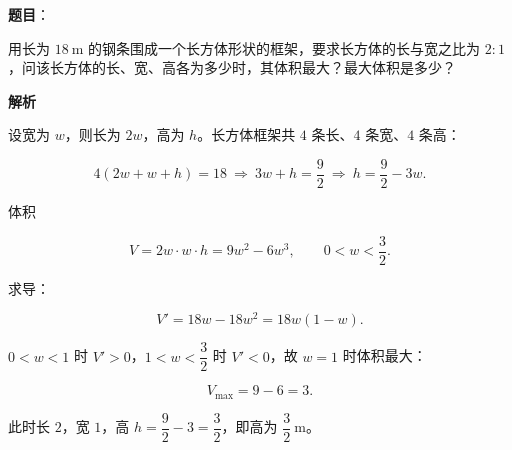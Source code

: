 \begin{answer}

\textbf{题目}：

用长为 $18\ \mathrm m$ 的钢条围成一个长方体形状的框架，要求长方体的长与宽之比为 $2:1$，问该长方体的长、宽、高各为多少时，其体积最大？最大体积是多少？

\textbf{解析}

设宽为 $w$，则长为 $2w$，高为 $h$。长方体框架共 $4$ 条长、$4$ 条宽、$4$ 条高：

\nopagebreak[4]
\[4(2w+w+h)=18\ \Rightarrow\ 3w+h=\frac92\ \Rightarrow\ h=\frac92-3w.\]

体积

\nopagebreak[4]
\[V=2w\cdot w\cdot h=9w^2-6w^3,\qquad 0<w<\frac32.\]

求导：

\nopagebreak[4]
\[V'=18w-18w^2=18w(1-w).\]

$0<w<1$ 时 $V'>0$，$1<w<\dfrac32$ 时 $V'<0$，故 $w=1$ 时体积最大：

\nopagebreak[4]
\[V_{\max}=9-6=3.\]

此时长 $2$，宽 $1$，高 $h=\dfrac92-3=\dfrac32$，即高为 $\dfrac32\ \mathrm m$。


\end{answer}
